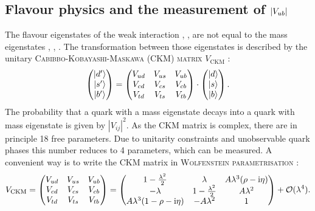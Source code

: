 \subsection{Flavour physics and the measurement of $|{V_{{u}{b}}}|$}
The flavour eigenstates of the weak interaction , ,  are not equal to the mass eigenstates \ket{\dquark}, \ket{\squark}, \ket{\bquark}.
The transformation between those eigenstates is described by the unitary \textsc{Cabibbo-Kobayashi-Maskawa (CKM) matrix} $V_\text{CKM}$ \cite{Kobayashi_CKM}:
\begin{align}
\begin{pmatrix}
|d'\rangle \\ |s'\rangle \\ |b'\rangle
\end{pmatrix}
=
\begin{pmatrix}
V_{ud} & V_{us} & V_{ub} \\
V_{cd} & V_{cs} & V_{cb} \\
V_{td} & V_{ts} & V_{tb} \\
\end{pmatrix}
\cdot
\begin{pmatrix}
|d\rangle \\ |s\rangle \\ |b\rangle
\end{pmatrix}.
\end{align}
The probability that a quark with a mass eigenstate  decays into a quark with mass eigenstate  is given by $|V_{ij}|^2$.
As the CKM matrix is complex, there are in principle 18 free parameters.
Due to unitarity constraints and unobservable quark phases this number reduces to 4 parameters, which can be measured.
A convenient way is to write the CKM matrix in \textsc{Wolfenstein parametrisation} \cite{Wolfenstein}:
\begin{align}
    V_{\text{CKM}}=
    \begin{pmatrix}
    V_{ud} & V_{us} & V_{ub} \\
    V_{cd} & V_{cs} & V_{cb} \\
    V_{td} & V_{ts} & V_{tb} \\
    \end{pmatrix}
    =
    \begin{pmatrix}
    1-\frac{\lambda^2}{2} & \lambda & A\lambda^3(\rho-\mathrm{i}\eta) \\
    -\lambda & 1-\frac{\lambda^2}{2} & A\lambda^2 \\
    A\lambda^3(1-\rho-\mathrm{i}\eta) & -A\lambda^2 & 1
    \end{pmatrix}
    + \mathcal{O}(\lambda^4).
\end{align}
